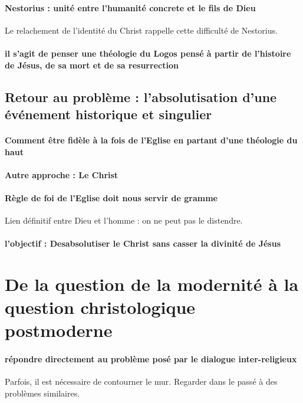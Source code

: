 \paragraph{Nestorius : unité entre l'humanité concrete et le fils de Dieu}
Le relachement de l'identité du Christ rappelle cette difficulté de Nestorius. 

\paragraph{il s'agit de penser une théologie du Logos pensé à partir de l'histoire de Jésus, de sa mort et de sa resurrection}



\subsection{Retour au problème : l’absolutisation d’une événement historique et singulier} 

\paragraph{Comment être fidèle à la fois de l'Eglise en partant d'une théologie du haut} 

\paragraph{Autre approche : Le Christ}

\paragraph{Règle de foi de l'Eglise doit nous servir de gramme} Lien définitif entre Dieu et l'homme : on ne peut pas le distendre. 

\paragraph{l'objectif : Desabsolutiser le Christ sans casser la divinité de Jésus
} 

\section{De la question de la modernité à la question christologique postmoderne}

\paragraph{répondre directement au problème posé par le dialogue inter-religieux} Parfois, il est nécessaire de contourner le mur. Regarder dans le passé à des problèmes similaires. 


